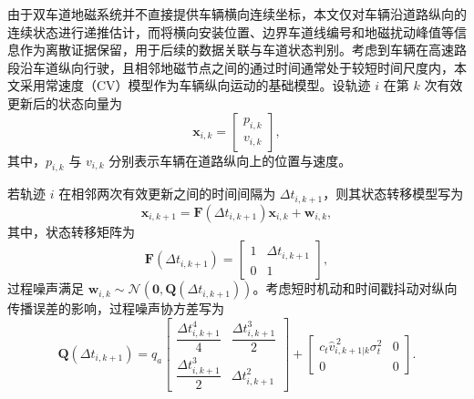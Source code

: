 \documentclass{xdupgthesis}
\begin{document}
由于双车道地磁系统并不直接提供车辆横向连续坐标，本文仅对车辆沿道路纵向的连续状态进行递推估计，而将横向安装位置、边界车道线编号和地磁扰动峰值等信息作为离散证据保留，用于后续的数据关联与车道状态判别。考虑到车辆在高速路段沿车道纵向行驶，且相邻地磁节点之间的通过时间通常处于较短时间尺度内，本文采用常速度（CV）模型作为车辆纵向运动的基础模型。设轨迹 $i$ 在第 $k$ 次有效更新后的状态向量为
\begin{equation}
	\mathbf x_{i,k}=
	\begin{bmatrix}
		p_{i,k}\\
		v_{i,k}
	\end{bmatrix},
	\label{eq:ch3_state_vec}
\end{equation}
其中，$p_{i,k}$ 与 $v_{i,k}$ 分别表示车辆在道路纵向上的位置与速度。

若轨迹 $i$ 在相邻两次有效更新之间的时间间隔为 $\Delta t_{i,k+1}$，则其状态转移模型写为
\begin{equation}
	\mathbf x_{i,k+1}=
	\mathbf F\left(\Delta t_{i,k+1}\right)\mathbf x_{i,k}+\mathbf w_{i,k},
	\label{eq:ch3_state_transition}
\end{equation}
其中，状态转移矩阵为
\begin{equation}
	\mathbf F\left(\Delta t_{i,k+1}\right)=
	\begin{bmatrix}
		1 & \Delta t_{i,k+1}\\
		0 & 1
	\end{bmatrix},
	\label{eq:ch3_F}
\end{equation}
过程噪声满足 $\mathbf w_{i,k}\sim\mathcal N(\mathbf 0,\mathbf Q(\Delta t_{i,k+1}))$。考虑短时机动和时间戳抖动对纵向传播误差的影响，过程噪声协方差写为
\begin{equation}
	\mathbf Q\left(\Delta t_{i,k+1}\right)
	=
	q_a
	\begin{bmatrix}
		\dfrac{\Delta t_{i,k+1}^{4}}{4} & \dfrac{\Delta t_{i,k+1}^{3}}{2}\\[6pt]
		\dfrac{\Delta t_{i,k+1}^{3}}{2} & \Delta t_{i,k+1}^{2}
	\end{bmatrix}
	+
	\begin{bmatrix}
		c_t \hat v_{i,k+1|k}^{\,2}\sigma_t^2 & 0\\
		0 & 0
	\end{bmatrix}.
	\label{eq:ch3_Q}
\end{equation}
\end{document}
